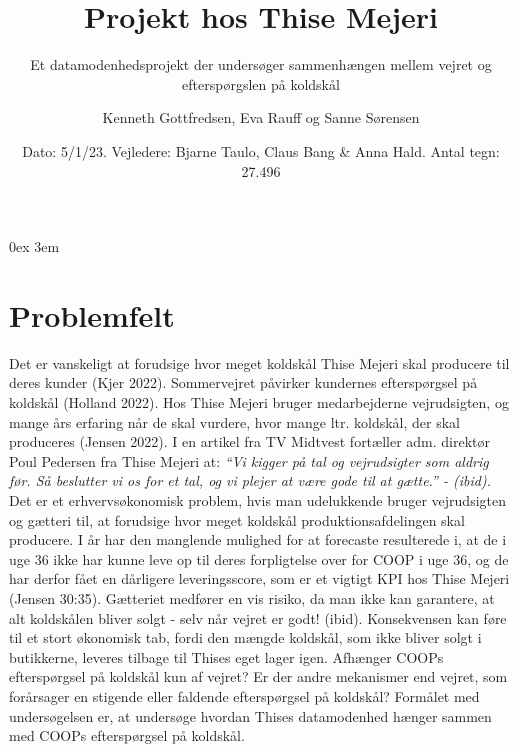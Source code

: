 \documentclass[
  12pt,
  a4paper,
  DIV=11,
  numbers=noendperiod]{scrartcl}
\title{Projekt hos Thise Mejeri}
\subtitle{Et datamodenhedsprojekt der undersøger sammenhængen mellem
vejret og efterspørgslen på koldskål}
\author{Kenneth Gottfredsen, Eva Rauff og Sanne Sørensen}
\date{Dato: 5/1/23. Vejledere: Bjarne Taulo, Claus Bang \& Anna Hald.
Antal tegn: 27.496}
\renewcommand*\contentsname{Table of contents}
\newcommand\contentsname{Table of contents}
\begin{document}
\maketitle
\ifdefined\Shaded\renewenvironment{Shaded}{\begin{tcolorbox}[boxrule=0pt, enhanced, sharp corners, breakable, interior hidden, borderline west={3pt}{0pt}{shadecolor}, frame hidden]}{\end{tcolorbox}}\fi

\renewcommand*\contentsname{Indholdsfortegnelse}
{
\hypersetup{linkcolor=}
\setcounter{tocdepth}{3}
\tableofcontents
}
\setcounter{page}{1} 
\parindent 0ex
\emergencystretch 3em
\pagestyle{fancy}
\fancyhead{}
\fancyfoot{}
\fancyfoot[C]{\thepage}
\renewcommand{\headrulewidth}{0.5pt}
\renewcommand{\footrulewidth}{0.5pt}

\hypertarget{problemfelt}{%
\section{Problemfelt}\label{problemfelt}}

Det er vanskeligt at forudsige hvor meget koldskål Thise Mejeri skal
producere til deres kunder (Kjer 2022). Sommervejret påvirker kundernes
efterspørgsel på koldskål (Holland 2022). Hos Thise Mejeri bruger
medarbejderne vejrudsigten, og mange års erfaring når de skal vurdere,
hvor mange ltr. koldskål, der skal produceres (Jensen 2022). I en
artikel fra TV Midtvest fortæller adm. direktør Poul Pedersen fra Thise
Mejeri at: \emph{``Vi kigger på tal og vejrudsigter som aldrig før. Så
beslutter vi os for et tal, og vi plejer at være gode til at gætte.'' -
(ibid).} Det er et erhvervsøkonomisk problem, hvis man udelukkende
bruger vejrudsigten og gætteri til, at forudsige hvor meget koldskål
produktionsafdelingen skal producere. I år har den manglende mulighed
for at forecaste resulterede i, at de i uge 36 ikke har kunne leve op
til deres forpligtelse over for COOP i uge 36, og de har derfor fået en
dårligere leveringsscore, som er et vigtigt KPI hos Thise Mejeri (Jensen
30:35). Gætteriet medfører en vis risiko, da man ikke kan garantere, at
alt koldskålen bliver solgt - selv når vejret er godt! (ibid).
Konsekvensen kan føre til et stort økonomisk tab, fordi den mængde
koldskål, som ikke bliver solgt i butikkerne, leveres tilbage til Thises
eget lager igen. Afhænger COOPs efterspørgsel på koldskål kun af vejret?
Er der andre mekanismer end vejret, som forårsager en stigende eller
faldende efterspørgsel på koldskål? Formålet med undersøgelsen er, at
undersøge hvordan Thises datamodenhed hænger sammen med COOPs
efterspørgsel på koldskål.
\end{document}

